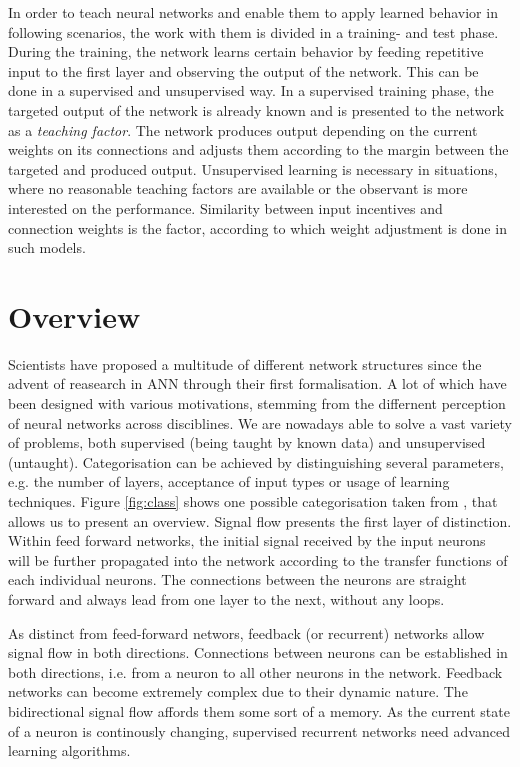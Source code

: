 \documentclass[10pt,a4paper,DIV=11]{scrreprt}
\begin{document}
In order to teach neural networks and enable them to apply learned behavior in following scenarios, the work with them is divided in a training- and test phase. During the training, the network learns certain behavior by feeding repetitive input to the first layer and observing the output of the network. This can be done in a supervised and unsupervised way. In a supervised training phase, the targeted output of the network is already known and is presented to the network as a \textit{teaching factor}. The network produces output depending on the current weights on its connections and adjusts them according to the margin between the targeted and produced output. Unsupervised learning is necessary in situations, where no reasonable teaching factors are available or the observant is more interested on the performance. Similarity between input incentives and connection weights is the factor, according to which weight adjustment is done in such models.

\section{Overview}

Scientists have proposed a multitude of different network structures since the advent of reasearch in ANN through their first formalisation. A lot of which have been designed with various motivations, stemming from the differnent perception of neural networks across disciblines. We are nowadays able to solve a vast variety of problems, both supervised (being taught by known data) and unsupervised (untaught). Categorisation can be achieved by distinguishing several parameters, e.g. the number of layers, acceptance of input types or usage of learning techniques. Figure \ref{fig:class} shows one possible categorisation taken from \cite{NNGER}, that allows us to present an overview. Signal flow presents the first layer of distinction. Within feed forward networks, the initial signal received by the input neurons will be further propagated into the network according to the transfer functions of each individual neurons. The connections between the neurons are straight forward and always lead from one layer to the next, without any loops. 

As distinct from feed-forward networs, feedback (or recurrent) networks allow signal flow in both directions. Connections between neurons can be established in both directions, i.e. from a neuron to all other neurons in the network. Feedback networks can become extremely complex due to their dynamic nature. The bidirectional signal flow affords them some sort of a memory. As the current state of a neuron is continously changing, supervised recurrent networks need advanced learning algorithms. 
\end{document}
